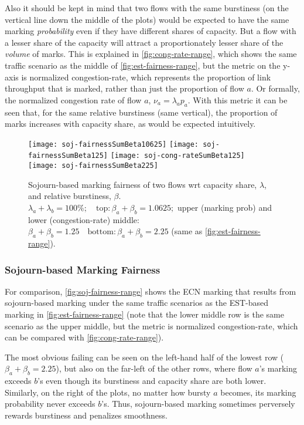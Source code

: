 Also it should be kept in mind that two flows with the same burstiness (on the vertical line down the middle of the plots) would be expected to have the same marking \emph{probability} even if they have different shares of capacity. But a flow with a lesser share of the capacity will attract a proportionately lesser share of the \emph{volume} of marks. This is explained in \autoref{fig:cong-rate-range}, which shows the same traffic scenario as the middle of \autoref{fig:est-fairness-range}, but the metric on the y-axis is normalized congestion-rate, which represents the proportion of link throughput that is marked, rather than just the proportion of flow \(a\). Or formally, the normalized congestion rate of flow \(a\), \(\nu_a = \lambda_a p_a\). With this metric it can be seen that, for the same relative burstiness (same vertical), the proportion of marks increases with capacity share, as would be expected intuitively.

\begin{figure*}
	\centering
	\texttt{[image: soj-fairnessSumBeta10625]}
	\texttt{[image: soj-fairnessSumBeta125]}
	\texttt{[image: soj-cong-rateSumBeta125]}
	\texttt{[image: soj-fairnessSumBeta225]}
	\caption{Sojourn-based marking fairness of two flows wrt capacity share, \(\lambda\), and relative burstiness, \(\beta\).\\
		\(\lambda_a+\lambda_b=100\%; \quad\mathrm{top:} \beta_a+\beta_b=1.0625;\) upper (marking prob) and lower (congestion-rate) middle: \(\beta_a+\beta_b=1.25 
		\quad\mathrm{bottom:} \beta_a+\beta_b=2.25\) (same as \autoref{fig:est-fairness-range}). 
}\label{fig:soj-fairness-range}
\end{figure*}

\subsubsection{Sojourn-based Marking Fairness}\label{sec:marking_fairness_expts_soj}

For comparison, \autoref{fig:soj-fairness-range} shows the ECN marking that results from sojourn-based marking under the same traffic scenarios as the EST-based marking in \autoref{fig:est-fairness-range} (note that the lower middle row is the same scenario as the upper middle, but the metric is normalized congestion-rate, which can be compared with \autoref{fig:cong-rate-range}).

The most obvious failing can be seen on the left-hand half of the lowest row (\(\beta_a+\beta_b=2.25\)), but also on the far-left of the other rows, where flow \(a\)'s marking exceeds \(b\)'s even though its burstiness and capacity share are both lower.
Similarly, on the right of the plots, no matter how bursty \(a\) becomes, its marking probability never exceeds \(b\)'s. Thus, sojourn-based marking sometimes perversely rewards burstiness and penalizes smoothness.

